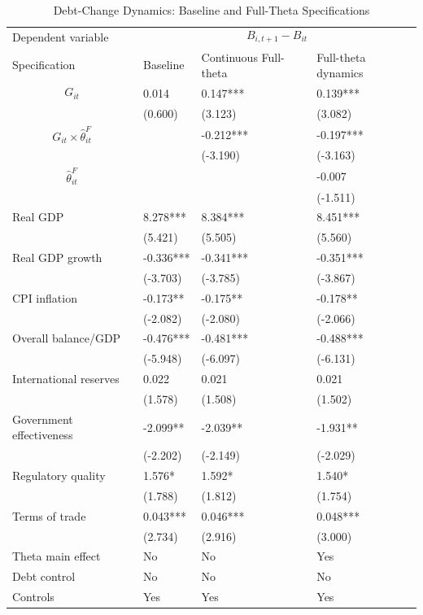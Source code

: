 \begin{table}[H]\centering
\begin{threeparttable}
\caption{Debt-Change Dynamics: Baseline and Full-Theta Specifications}
\label{tab:debt_change_combined_fulltheta}
\scriptsize
\begin{tabularx}{\textwidth}{lYYY}
\toprule
Dependent variable &  \\
\cmidrule(lr){2-4}
Specification & Baseline & Continuous Full-theta & Full-theta dynamics \\
\midrule
$$G_{it}$$ & 0.014 & 0.147*** & 0.139*** \\
 & (0.600) & (3.123) & (3.082) \\
$$G_{it}\times\widehat{\theta}^{F}_{it}$$ &  & -0.212*** & -0.197*** \\
 &  & (-3.190) & (-3.163) \\
$$\widehat{\theta}^{F}_{it}$$ &  &  & -0.007 \\
 &  &  & (-1.511) \\
Real GDP & 8.278*** & 8.384*** & 8.451*** \\
 & (5.421) & (5.505) & (5.560) \\
Real GDP growth & -0.336*** & -0.341*** & -0.351*** \\
 & (-3.703) & (-3.785) & (-3.867) \\
CPI inflation & -0.173** & -0.175** & -0.178** \\
 & (-2.082) & (-2.080) & (-2.066) \\
Overall balance/GDP & -0.476*** & -0.481*** & -0.488*** \\
 & (-5.948) & (-6.097) & (-6.131) \\
International reserves & 0.022 & 0.021 & 0.021 \\
 & (1.578) & (1.508) & (1.502) \\
Government effectiveness & -2.099** & -2.039** & -1.931** \\
 & (-2.202) & (-2.149) & (-2.029) \\
Regulatory quality & 1.576* & 1.592* & 1.540* \\
 & (1.788) & (1.812) & (1.754) \\
Terms of trade & 0.043*** & 0.046*** & 0.048*** \\
 & (2.734) & (2.916) & (3.000) \\
\midrule
Theta main effect & No & No & Yes \\
Debt control & No & No & No \\
Controls & Yes & Yes & Yes \\

\end{tabularx}
\end{threeparttable}
\end{table}
